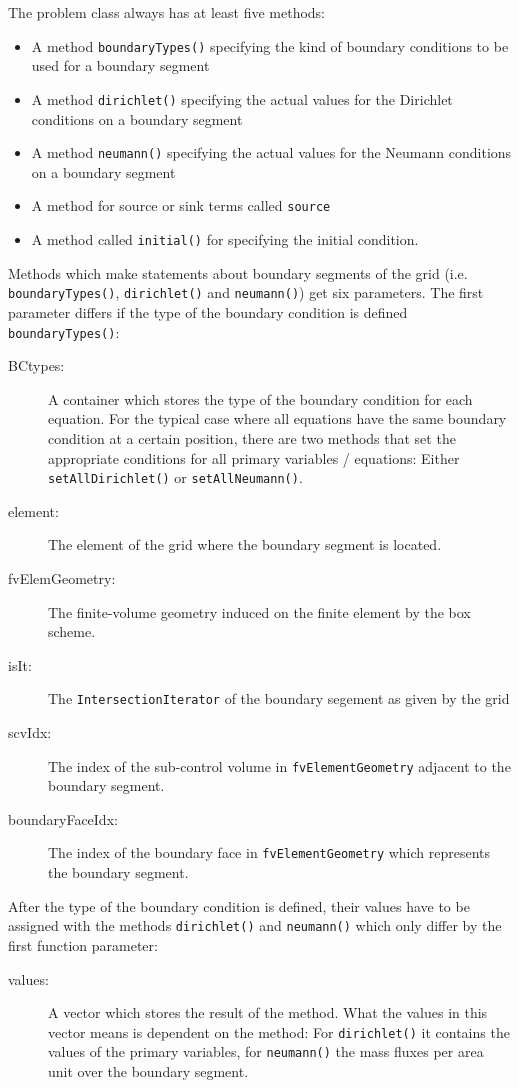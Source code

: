 The problem class always has at least five methods:
\begin{itemize}
\item A method \texttt{boundaryTypes()} specifying the kind of
  boundary conditions to be used for a boundary segment
\item A method \texttt{dirichlet()} specifying the actual values for
  the Dirichlet conditions on a boundary segment
\item A method \texttt{neumann()} specifying the actual values for
  the Neumann conditions on a boundary segment
\item A method for source or sink terms called \texttt{source}
\item A method called \texttt{initial()} for specifying the initial
  condition.
\end{itemize}

Methods which make statements about boundary segments of the grid (i.e. 
\texttt{boundaryTypes()}, \texttt{dirichlet()} and \texttt{neumann()}) get 
six parameters. The first parameter differs if the type of the boundary condition
is defined \texttt{boundaryTypes()}:
\begin{description}
\item[BCtypes:] A container which stores the type of the boundary condition
for each equation. For the typical case where all equations have the same boundary
condition at a certain position, there are two methods that set the appropriate conditions
for all primary variables / equations: Either \texttt{setAllDirichlet()} or \texttt{setAllNeumann()}.
\item[element:] The element of the grid where the boundary segment
  is located.
\item[fvElemGeometry:] The finite-volume geometry induced on the
  finite element by the box scheme.
\item[isIt:] The \texttt{IntersectionIterator} of the boundary
  segement as given by the grid
\item[scvIdx:] The index of the sub-control volume in
  \texttt{fvElementGeometry} adjacent to the boundary segment.
\item[boundaryFaceIdx:] The index of the boundary face in
  \texttt{fvElementGeometry} which represents the boundary segment.  
\end{description}
After the type of the boundary condition is defined, their values have to be
assigned with the methods \texttt{dirichlet()} and \texttt{neumann()} which only differ 
by the first function parameter:
\begin{description}
 \item[values:] A vector which stores the result of the method. What
  the values in this vector means is dependent on the method: For
  \texttt{dirichlet()} it contains the values of the primary
  variables, for \texttt{neumann()} the mass fluxes per area unit
  over the boundary segment.
\end{description}

